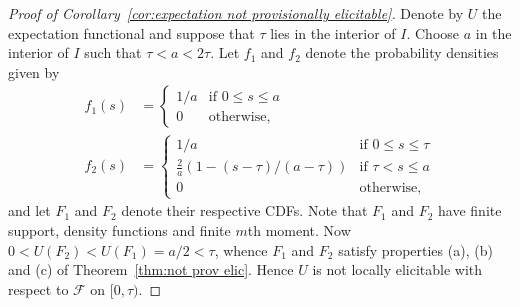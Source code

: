 \documentclass[10pt]{article} %
\theoremstyle{theorem}
\theoremstyle{definition}
\begin{document}
\begin{proof}[Proof of Corollary~\ref{cor:expectation not provisionally elicitable}]
Denote by $U$ the expectation functional and suppose that $\tau$ lies in the interior of $I$.
Choose $a$ in the interior of $I$ such that $\tau<a<2\tau$. Let $f_1$ and $f_2$ denote the probability densities given by
\begin{align*}
f_1(s)&=
\begin{cases}
1/a & \text{if } 0\leq s \leq a \\
0 & \text{otherwise},
\end{cases} \\
f_2(s)&=
\begin{cases}
1/a & \text{if } 0\leq s \leq \tau \\
\frac{2}{a}(1 - (s-\tau)/(a-\tau)) & \text{if } \tau < s \leq a \\
0 & \text{otherwise,}
\end{cases}
\end{align*}
and let $F_1$ and $F_2$ denote their respective CDFs. Note that $F_1$ and $F_2$ have finite support, density functions and finite $m$th moment. Now $0 < U(F_2) < U(F_1)=a/2<\tau$, whence $F_1$ and $F_2$ satisfy properties (a), (b) and (c) of Theorem~\ref{thm:not prov elic}.  Hence $U$ is not locally elicitable with respect to $\mathcal{F}$ on $[0,\tau)$.
\end{proof}









\end{document}
